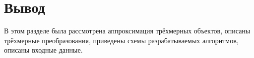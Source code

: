 \section{Вывод}
В этом разделе была рассмотрена аппроксимация трёхмерных объектов, описаны трёхмерные преобразования,
приведены схемы разрабатываемых алгоритмов, описаны входные данные. 
